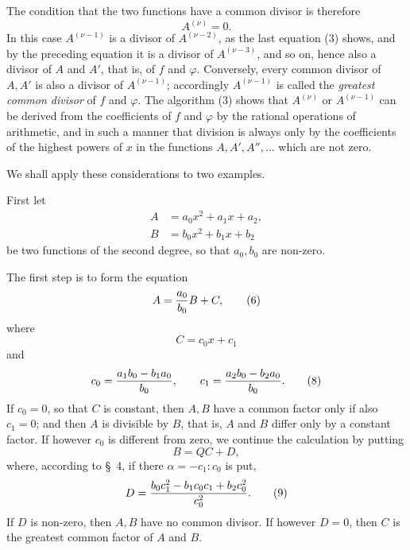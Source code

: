 \documentclass[11pt]{article}
\begin{document}
The condition that the two functions have a common divisor is therefore
\begin{equation}
 A^{(\nu)}=0.
\tag{4}
\end{equation}
In this case $A^{(\nu-1)}$ is a divisor of $A^{(\nu-2)}$, as the last equation (3) shows, and by the preceding equation it is a divisor of $A^{(\nu-3)}$, and so on, hence also a divisor of $A$ and $A'$, that is, of $f$ and $\varphi$. Conversely, every common divisor of $A,A'$ is also a divisor of $A^{(\nu-1)}$; accordingly $A^{(\nu-1)}$ is called the \emph{greatest common divisor} of $f$ and $\varphi$. The algorithm (3) shows that $A^{(\nu)}$ or $A^{(\nu-1)}$ can be derived from the coefficients of $f$ and $\varphi$ by the rational operations of arithmetic, and in such a manner that division is always only by the coefficients of the highest powers of $x$ in the functions $A,A',A'',\ldots$ which are not zero.

We shall apply these considerations to two examples.

First let
\begin{equation}
\begin{aligned}
 A&=a_0x^2+a_1x+a_2,\\
 B&=b_0x^2+b_1x+b_2
\end{aligned}
\tag{5}
\end{equation}
be two functions of the second degree, so that $a_0,b_0$ are non-zero.

The first step is to form the equation
\begin{equation}
 A={a_0\over b_0}B+C,
\tag{6}
\end{equation}
where
\begin{equation}
 C=c_0x+c_1
\tag{7}
\end{equation}
and
\begin{equation}
 c_0={a_1b_0-b_1a_0\over b_0},
 \qquad
 c_1={a_2b_0-b_2a_0\over b_0}.
\tag{8}
\end{equation}
If $c_0=0$, so that $C$ is constant, then $A,B$ have a common factor only if also $c_1=0$; and then $A$ is divisible by $B$, that is, $A$ and $B$ differ only by a constant factor. If however $c_0$ is different from zero, we continue the calculation by putting
\[
 B=QC+D,
\]
where, according to \S~4, if there $\alpha=-c_1:c_0$ is put,
\begin{equation}
 D={b_0c_1^2-b_1c_0c_1+b_2c_0^2\over c_0^2}.
\tag{9}
\end{equation}
If $D$ is non-zero, then $A,B$ have no common divisor. If however $D=0$, then $C$ is the greatest common factor of $A$ and $B$.
\end{document}
